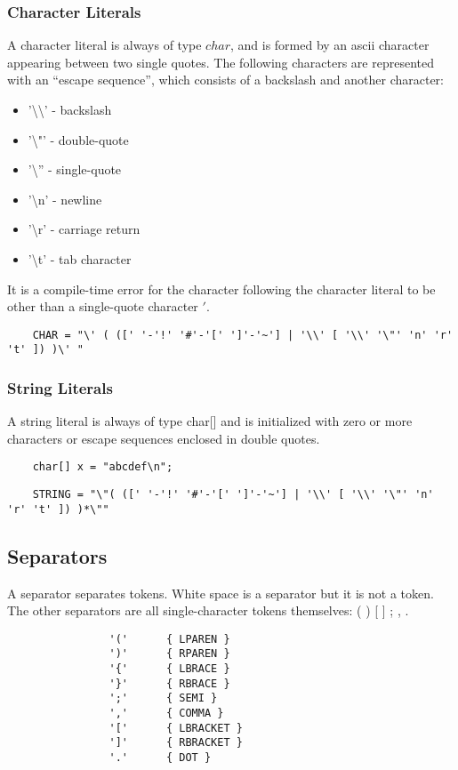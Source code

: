 \begin{homeworkProblem}
	\subsubsection{Character Literals}
	A character literal is always of type $char$, and is formed by an ascii character appearing between two single quotes. The following characters are represented with an “escape sequence”, which consists of a backslash and another character:\\
	\begin{itemize}
		\item '\textbackslash\textbackslash' - backslash
		\item '\textbackslash"' - double-quote
		\item '\textbackslash'' - single-quote
		\item '\textbackslash n' - newline
		\item '\textbackslash r' - carriage return
		\item '\textbackslash t' - tab character
	\end{itemize}
	It is a compile-time error for the character following the character literal to be other than a single-quote character $'$.
	
	\begin{verbatim}
	CHAR = "\' ( ([' '-'!' '#'-'[' ']'-'~'] | '\\' [ '\\' '\"' 'n' 'r' 't' ]) )\' "
	\end{verbatim}
	
	
	\subsubsection{String Literals}
	A string literal is always of type char[] and is initialized with zero or more characters or escape sequences enclosed in double quotes.
    \begin{verbatim}
	char[] x = "abcdef\n";
    \end{verbatim}
	
	\begin{verbatim}
	STRING = "\"( ([' '-'!' '#'-'[' ']'-'~'] | '\\' [ '\\' '\"' 'n' 'r' 't' ]) )*\""
	\end{verbatim}
	
	\subsection{Separators}
	A separator separates tokens. White space is a separator but it is not a token. The other separators are all single-character tokens themselves:
	     ( ) [ ] { } ; , .
	\begin{verbatim}
				'('      { LPAREN }
				')'      { RPAREN }
				'{'      { LBRACE }
				'}'      { RBRACE }
				';'      { SEMI }
				','      { COMMA }
				'['      { LBRACKET }
				']'      { RBRACKET }
				'.'      { DOT }
 	\end{verbatim}
 	

\end{homeworkProblem}
